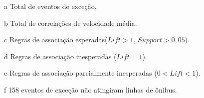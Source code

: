 \documentclass[
	12pt,				%
	oneside,			%
	a4paper,			%
	english,			%
	brazil				%
	]{abntex2ppgsi}
\begin{document}
{{{\begin{apendicesenv}
\begin{table}[!htb]
\begin{threeparttable}
\begin{tablenotes}
            \item[a] Total de eventos de exceção.
            \item[b] Total de correlações de velocidade média.
            \item[c] Regras de associação esperadas($Lift > 1$, $Support > 0,05$).
            \item[d] Regras de associação inesperadas ($Lift = 1$).
            \item[e] Regras de associação parcialmente inesperadas ($0 < Lift < 1$).
            \item[f] 158 eventos de exceção não atingiram linhas de ônibus.
        \end{tablenotes}
\end{threeparttable}
\end{table}



\end{apendicesenv}}}}
\end{document}

